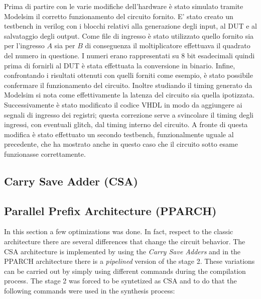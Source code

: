 Prima di partire con le varie modifiche dell'hardware è stato simulato tramite Modelsim il corretto funzionamento del circuito fornito. E' stato creato un testbench in verilog con i blocchi relativi alla generazione degli input, al DUT e al salvataggio degli output.
Come file di ingresso è stato utilizzato quello fornito sia per l'ingresso $A$ sia per $B$ di conseguenza il moltiplicatore effettuava il quadrato del numero in questione. I numeri erano rappresentati su 8 bit esadecimali quindi prima di fornirli al DUT è stata effettuata la conversione in binario.
Infine, confrontando i risultati ottenuti con quelli forniti come esempio, è stato possibile confermare il funzionamento del circuito. Inoltre studiando il timing generato da Modelsim si nota come effettivamente la latenza del circuito sia quella ipotizzata.
\\
Successivamente è stato modificato il codice VHDL in modo da aggiungere ai segnali di ingresso dei registri; questa correzione serve a svincolare il timing degli ingressi, con eventuali glitch, dal timing interno del circuito.
A fronte di questa modifica è stato effettuato un secondo testbench, funzionalmente uguale al precedente, che ha mostrato anche in questo caso che il circuito sotto esame funzionasse correttamente.



\subsection{Carry Save Adder (CSA)}
\subsection{Parallel Prefix Architecture (PPARCH)}
In this section a few optimizations was done. In fact, respect to the classic architecture there are several differences that change the circuit behavior. The CSA architecture is implemented by using the \textit{Carry Save Adders} and in the PPARCH architecture there is a \textit{pipelined} version of the stage 2. These variations can be carried out by simply using different commands during the compilation process. The stage 2 was forced to be syntetized as CSA and to do that the following commands were used in the synthesis process:


